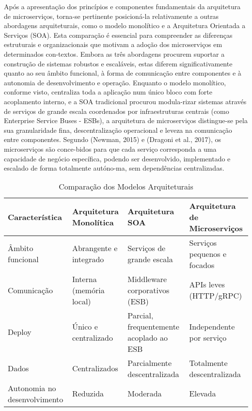 Após a apresentação dos princípios e componentes fundamentais da arquitetura de microserviços, torna-se pertinente posicioná-la relativamente a outras abordagens arquiteturais, como o modelo monolítico e a Arquitetura Orientada a Serviços (SOA). Esta comparação é essencial para compreender as diferenças estruturais e organizacionais que motivam a adoção dos microserviços em determinados con-textos.
Embora as três abordagens procurem suportar a construção de sistemas robustos e escaláveis, estas diferem significativamente quanto ao seu âmbito funcional, à forma de comunicação entre componentes e à autonomia de desenvolvimento e operação.
Enquanto o modelo monolítico, conforme visto, centraliza toda a aplicação num único bloco com forte acoplamento interno, e a SOA tradicional procurou modula-rizar sistemas através de serviços de grande escala coordenados por infraestruturas centrais (como Enterprise Service Buses - ESBs), a arquitetura de microserviços distingue-se pela sua granularidade fina, descentralização operacional e leveza na comunicação entre componentes.
Segundo (Newman, 2015) e (Dragoni et al., 2017), os microserviços são conce-bidos para que cada serviço corresponda a uma capacidade de negócio específica, podendo ser desenvolvido, implementado e escalado de forma totalmente autóno-ma, sem dependências centralizadas.


\begin{table}[H]
\centering
\caption{Comparação dos Modelos Arquiteturais}
\label{tab:comparacao_modelos}
\begin{tabular}{|p{4cm}|p{4cm}|p{4cm}|p{4cm}|}
\hline
\textbf{Característica} & \textbf{Arquitetura Monolítica} & \textbf{Arquitetura SOA} & \textbf{Arquitetura de Microserviços} \\
\hline
Âmbito funcional & Abrangente e integrado & Serviços de grande escala & Serviços pequenos e focados \\
\hline
Comunicação & Interna (memória local) & Middleware corporativos (ESB) & APIs leves (HTTP/gRPC) \\
\hline
Deploy & Único e centralizado & Parcial, frequentemente acoplado ao ESB & Independente por serviço \\
\hline
Dados & Centralizados & Parcialmente descentralizada & Totalmente descentralizada \\
\hline
Autonomia no desenvolvimento & Reduzida & Moderada & Elevada \\
\hline
\end{tabular}
\end{table}

